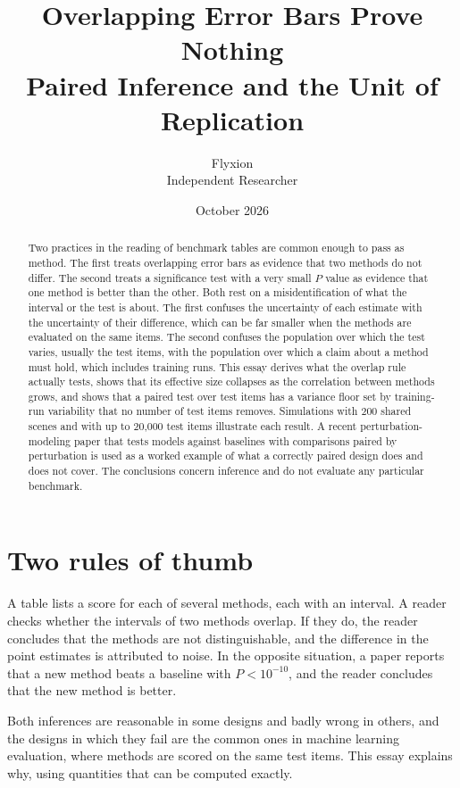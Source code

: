 \documentclass[11pt]{article}
\title{Overlapping Error Bars Prove Nothing\\[4pt]
\large Paired Inference and the Unit of Replication}
\author{Flyxion\\Independent Researcher}
\date{October 2026}
\theoremstyle{definition}
\begin{document}
\maketitle

\begin{abstract}
\noindent
Two practices in the reading of benchmark tables are common enough to pass as method. The first treats overlapping error bars as evidence that two methods do not differ. The second treats a significance test with a very small $P$ value as evidence that one method is better than the other. Both rest on a misidentification of what the interval or the test is about. The first confuses the uncertainty of each estimate with the uncertainty of their difference, which can be far smaller when the methods are evaluated on the same items. The second confuses the population over which the test varies, usually the test items, with the population over which a claim about a method must hold, which includes training runs. This essay derives what the overlap rule actually tests, shows that its effective size collapses as the correlation between methods grows, and shows that a paired test over test items has a variance floor set by training-run variability that no number of test items removes. Simulations with 200 shared scenes and with up to 20{,}000 test items illustrate each result. A recent perturbation-modeling paper that tests models against baselines with comparisons paired by perturbation is used as a worked example of what a correctly paired design does and does not cover. The conclusions concern inference and do not evaluate any particular benchmark.
\end{abstract}

\section{Two rules of thumb}

A table lists a score for each of several methods, each with an interval. A reader checks whether the intervals of two methods overlap. If they do, the reader concludes that the methods are not distinguishable, and the difference in the point estimates is attributed to noise. In the opposite situation, a paper reports that a new method beats a baseline with $P<10^{-10}$, and the reader concludes that the new method is better.

Both inferences are reasonable in some designs and badly wrong in others, and the designs in which they fail are the common ones in machine learning evaluation, where methods are scored on the same test items. This essay explains why, using quantities that can be computed exactly.
\end{document}
